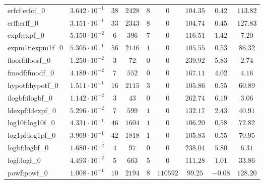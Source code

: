 \begin{tabular}{|l|c|c|c|c|c|c|c|c|}
erfcf:erfcf\_0               & $ 3.642 \cdot 10^{-1} $ & $ 38     $ & $ 2428  $ & $ 8   $ & $ 0      $ & $ 104.35      $ & $ 0.42    $ & $ 113.82  $ \\
erff:erff\_0                 & $ 3.151 \cdot 10^{-1} $ & $ 33     $ & $ 2343  $ & $ 8   $ & $ 0      $ & $ 104.74      $ & $ 0.45    $ & $ 127.83  $ \\
expf:expf\_0                 & $ 5.150 \cdot 10^{-2} $ & $ 6      $ & $ 396   $ & $ 7   $ & $ 0      $ & $ 116.51      $ & $ 1.42    $ & $ 7.20    $ \\
expm1f:expm1f\_0             & $ 5.305 \cdot 10^{-1} $ & $ 56     $ & $ 2146  $ & $ 1   $ & $ 0      $ & $ 105.55      $ & $ 0.53    $ & $ 86.32   $ \\
floorf:floorf\_0             & $ 1.250 \cdot 10^{-2} $ & $ 3      $ & $ 72    $ & $ 0   $ & $ 0      $ & $ 239.92      $ & $ 5.83    $ & $ 2.74    $ \\
fmodf:fmodf\_0               & $ 4.189 \cdot 10^{-2} $ & $ 7      $ & $ 552   $ & $ 0   $ & $ 0      $ & $ 167.11      $ & $ 4.02    $ & $ 4.16    $ \\
hypotf:hypotf\_0             & $ 1.511 \cdot 10^{-1} $ & $ 16     $ & $ 2115  $ & $ 3   $ & $ 0      $ & $ 105.86      $ & $ 0.55    $ & $ 60.89   $ \\
ilogbf:ilogbf\_0             & $ 1.142 \cdot 10^{-2} $ & $ 3      $ & $ 43    $ & $ 0   $ & $ 0      $ & $ 262.74      $ & $ 6.19    $ & $ 3.06    $ \\
ldexpf:ldexpf\_0             & $ 5.296 \cdot 10^{-2} $ & $ 7      $ & $ 599   $ & $ 1   $ & $ 0      $ & $ 132.17      $ & $ 2.43    $ & $ 40.91   $ \\
log10f:log10f\_0             & $ 4.331 \cdot 10^{-1} $ & $ 46     $ & $ 1604  $ & $ 1   $ & $ 0      $ & $ 106.20      $ & $ 0.58    $ & $ 72.82   $ \\
log1pf:log1pf\_0             & $ 3.969 \cdot 10^{-1} $ & $ 42     $ & $ 1818  $ & $ 1   $ & $ 0      $ & $ 105.83      $ & $ 0.55    $ & $ 70.95   $ \\
logbf:logbf\_0               & $ 1.680 \cdot 10^{-2} $ & $ 4      $ & $ 97    $ & $ 0   $ & $ 0      $ & $ 238.04      $ & $ 5.80    $ & $ 6.31    $ \\
logf:logf\_0                 & $ 4.493 \cdot 10^{-2} $ & $ 5      $ & $ 663   $ & $ 5   $ & $ 0      $ & $ 111.28      $ & $ 1.01    $ & $ 33.86   $ \\
powf:powf\_0                 & $ 1.008 \cdot 10^{-1} $ & $ 10     $ & $ 2194  $ & $ 8   $ & $ 110592 $ & $ 99.25       $ & $ -0.08   $ & $ 128.20  $ \\

\end{tabular}
